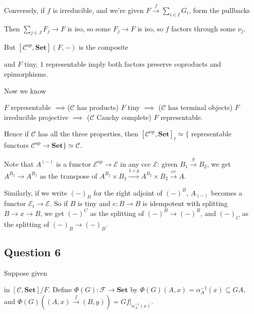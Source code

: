 \documentclass[a4paper]{article}
\begin{document}
Conversely, if $f$ is irreducible, and we're given $F \xrightarrow{f} \sum_{i \in I} G_i$, form the pullbacks


Then $\sum_{j \in J} F_j \to F$ is iso, so some $F_j \to F$ is iso, so $f$ factors through some $\nu_j$.

But $[\mathcal{C}^{op},\mathbf{Set}](F,-)$ is the composite


and $F$ tiny, $1$ representable imply both factors preserve coproducts and epimorphisms.

Now we know

$F$ representable $\implies$($\mathcal{C}$ has products) $F$ tiny $\implies$ ($\mathcal{C}$ has terminal objects) $F$ irreducible projective $\implies$ ($\mathcal{C}$ Cauchy complete) $F$ representable.

Hence if $\mathcal{C}$ has all the three properties, then $[\mathcal{C}^{op},\mathbf{Set}]_t \simeq \{$ representable functors $\mathcal{C}^{op} \to \mathbf{Set}\} \simeq \mathcal{C}$.

Note that $A^{(-)}$ is a functor $\mathcal{E}^{op} \to \mathcal{E}$ in any ccc $\mathcal{E}$: given $B_1 \xrightarrow{g} B_2$, we get $A^{B_2} \to A^{B_1}$ as the transpose of $A^{B_2} \times B_1 \xrightarrow{1 \times g} A^{B_2} \times B_2 \xrightarrow{ev} A$.

Similarly, if we write $(-)_B$ for the right adjoint of $(-)^B$, $A_{(-)}$ becomes a functor $\mathcal{E}_t \to \mathcal{E}$. So if $B$ is tiny and $e:B \to B$ is idempotent with splitting $B \to x \to B$, we get $(-)^C$ as the splitting of $(-)^B \to (-)^B$, and $(-)_C$ as the splitting of $(-)_B \to (-)_B$.

\subsection{Question 6}
 Suppose given 
in $[\mathcal{C},\mathbf{Set}]/F$. Define $\Phi(G):\mathcal{F} \to \mathbf{Set}$ by $\Phi(G)(A,x) = \alpha_A^{-1} (x) \subseteq GA$, and $\Phi(G)((A,x) \xrightarrow{f} (B,y)) = Gf|_{\alpha_A^{-1}(x)}$.
\end{document}
